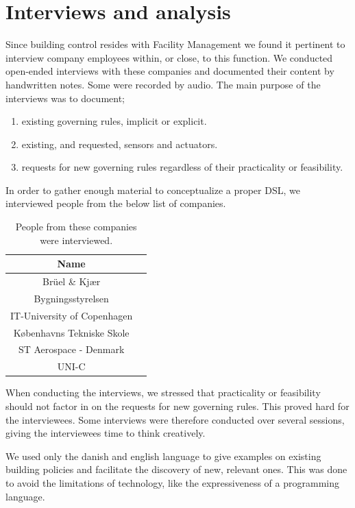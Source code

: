 \documentclass{llncs}
\begin{document}
\section{Interviews and analysis}\label{sec:interviews}
Since building control resides with Facility Management we found it pertinent to interview company employees within, or close, to this function. We conducted open-ended interviews with these companies and documented their content by handwritten notes. Some were recorded by audio. The main purpose of the interviews was to document;

\begin{enumerate}
	\item existing governing rules, implicit or explicit.
	\item existing, and requested, sensors and actuators.
	\item requests for new governing rules regardless of their practicality or feasibility.
\end{enumerate}

In order to gather enough material to conceptualize a proper DSL, we interviewed people from the below list of companies.\\ 

\begin{table}[htdp]
\begin{center}
\begin{tabular}{|c|c|}
	\textbf{Name}\\
	\hline 
	Br\"{u}el \& Kj\ae r\\
	Bygningsstyrelsen\\
	IT-University of Copenhagen\\
	K\o benhavns Tekniske Skole\\
	ST Aerospace - Denmark\\
	UNI-C\\
\end{tabular}
\end{center}
\label{tab:interviewees}
\caption{People from these companies were interviewed.}
\end{table}%

When conducting the interviews, we stressed that practicality or feasibility should not factor in on the requests for new governing rules. This proved hard for the interviewees. Some interviews were therefore conducted over several sessions, giving the interviewees time to think creatively. 

We used only the danish and english language to give examples on existing building policies and facilitate the discovery of new, relevant ones. This was done to avoid the limitations of technology, like the expressiveness of a programming language.
\end{document}
